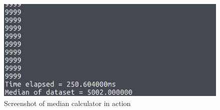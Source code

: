 \documentclass{article}
\begin{document}
    	\begin{figure}[H]
    		\centering
    		\includegraphics[width=\linewidth]{median_screenshot.png}
    		\caption{Screenshot of median calculator in action}
    	\end{figure}
\end{document}
